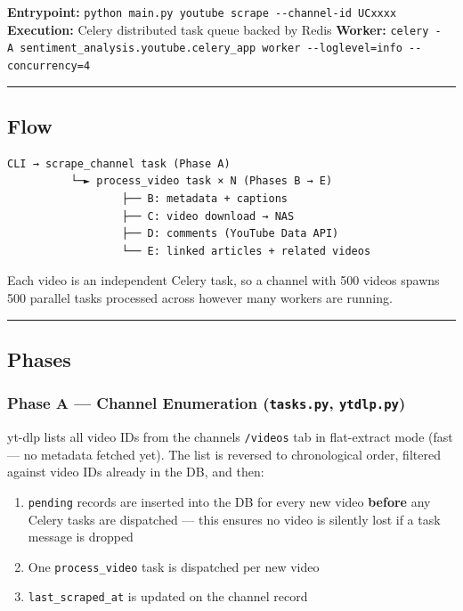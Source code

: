 \documentclass[
]{article}
\providecommand{\tightlist}{%
  \setlength{\itemsep}{0pt}\setlength{\parskip}{0pt}}
\begin{document}
\textbf{Entrypoint:}
\texttt{python\ main.py\ youtube\ scrape\ -\/-channel-id\ UCxxxx}
\textbf{Execution:} Celery distributed task queue backed by Redis
\textbf{Worker:}
\texttt{celery\ -A\ sentiment\_analysis.youtube.celery\_app\ worker\ -\/-loglevel=info\ -\/-concurrency=4}

\begin{center}\rule{0.5\linewidth}{0.5pt}\end{center}

\subsection{Flow}\label{flow-1}

\begin{verbatim}
CLI → scrape_channel task (Phase A)
          └─► process_video task × N (Phases B → E)
                  ├── B: metadata + captions
                  ├── C: video download → NAS
                  ├── D: comments (YouTube Data API)
                  └── E: linked articles + related videos
\end{verbatim}

Each video is an independent Celery task, so a channel with 500 videos
spawns 500 parallel tasks processed across however many workers are
running.

\begin{center}\rule{0.5\linewidth}{0.5pt}\end{center}

\subsection{Phases}\label{phases}

\subsubsection{\texorpdfstring{Phase A --- Channel Enumeration
(\texttt{tasks.py},
\texttt{ytdlp.py})}{Phase A --- Channel Enumeration (tasks.py, ytdlp.py)}}\label{phase-a--channel-enumeration-taskspy-ytdlppy}

yt-dlp lists all video IDs from the channel\textquotesingle s
\texttt{/videos} tab in flat-extract mode (fast --- no metadata fetched
yet). The list is reversed to chronological order, filtered against
video IDs already in the DB, and then:

\begin{enumerate}
\def\labelenumi{\arabic{enumi}.}
\tightlist
\item
  \texttt{pending} records are inserted into the DB for every new video
  \textbf{before} any Celery tasks are dispatched --- this ensures no
  video is silently lost if a task message is dropped
\item
  One \texttt{process\_video} task is dispatched per new video
\item
  \texttt{last\_scraped\_at} is updated on the channel record
\end{enumerate}
\end{document}

